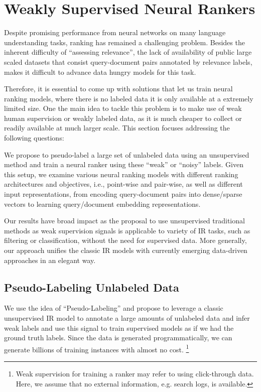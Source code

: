 \section{Weakly Supervised Neural Rankers}
\label{sec:weakly_supervised_neural_rankers}
Despite promising performance from neural networks on many language understanding tasks, ranking has remained a challenging problem. Besides the inherent difficulty of ``assessing relevance'', the lack of availability of public large scaled datasets that consist query-document pairs annotated by relevance labels, makes it difficult to advance data hungry models for this task.

Therefore, it is essential to come up with solutions that let us train neural ranking models, where there is no labeled data it is only available at a extremely limited size. 
One the main idea to tackle this problem is to make use of weak human supervision or weakly labeled data, as it is much cheaper to collect or readily available at much larger scale. This section focuses addressing the following questions:

We propose to pseudo-label a large set of unlabeled data using an unsupervised method and train a neural ranker using these ``weak'' or ``noisy'' labels. Given this setup, we examine various neural ranking models with different ranking architectures and objectives, i.e., point-wise and pair-wise, as well as different input representations, from encoding query-document pairs into dense\:/\:sparse vectors to learning query\:/\:document embedding representations. 

Our results have broad impact as the proposal to use unsupervised traditional methods as weak supervision signals is applicable to variety of IR tasks, such as filtering or classification, without the need for supervised data.  More generally, our approach unifies the classic IR models with currently emerging data-driven approaches in an elegant way.

\subsection{Pseudo-Labeling Unlabeled Data}
\label{sec:pseudo_labeling}
We use the idea of ``Pseudo-Labeling'' and propose to leverage a classic unsupervised IR model to annotate a large amounts of unlabeled data and infer weak labels and use this signal to train supervised models as if we had the ground truth labels.
Since the data is generated programmatically, we can generate billions of training instances with almost no cost. 
\footnote{Weak supervision for training a ranker may refer to using click-through data. Here, we assume that no external information, e.g. search logs, is available.}

